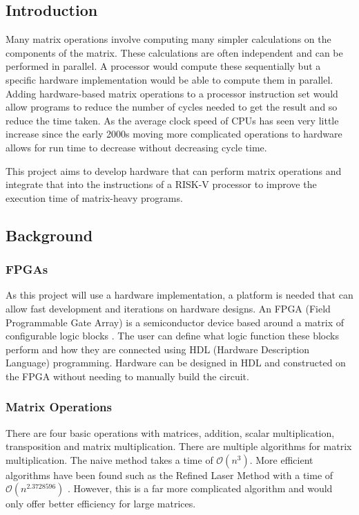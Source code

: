 \subsection{Introduction}
Many matrix operations involve computing many simpler calculations on the components of the matrix. These calculations are often independent and can be performed in parallel. A processor would compute these sequentially but a specific hardware implementation would be able to compute them in parallel. Adding hardware-based matrix operations to a processor instruction set would allow programs to reduce the number of cycles needed to get the result and so reduce the time taken. As the average clock speed of CPUs has seen very little increase since the early 2000s moving more complicated operations to hardware allows for run time to decrease without decreasing cycle time.

This project aims to develop hardware that can perform matrix operations and integrate that into the instructions of a RISK-V processor to improve the execution time of matrix-heavy programs.

\subsection{Background}
\subsubsection{FPGAs}
As this project will use a hardware implementation, a platform is needed that can allow fast development and iterations on hardware designs. An FPGA (Field Programmable Gate Array) is a semiconductor device based around a matrix of configurable logic blocks \cite{whatisanfpga}. The user can define what logic function these blocks perform and how they are connected using HDL (Hardware Description Language) programming. Hardware can be designed in HDL and constructed on the FPGA without needing to manually build the circuit.

\subsubsection{Matrix Operations}
There are four basic operations with matrices, addition, scalar multiplication, transposition and matrix multiplication. There are multiple algorithms for matrix multiplication. The naive method takes a time of $\mathcal{O}(n^{3})$. More efficient algorithms have been found such as the Refined Laser Method with a time of $\mathcal{O}(n^{2.3728596})$ \cite{alman2020refined}. However, this is a far more complicated algorithm and would only offer better efficiency for large matrices.

